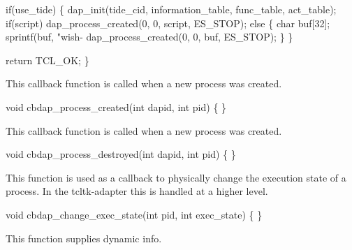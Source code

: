  if(use_tide) \{
    dap_init(tide_cid, information_table, func_table, act_table);
    if(script)
      dap_process_created(0, 0, script, ES_STOP);
    else \{
      char buf[32];
      sprintf(buf, "wish-%
      dap_process_created(0, 0, buf, ES_STOP);
    \}
  \}

  return TCL_OK;
\}
\nwendcode{}\nwdocspar



This callback function is called when a new process was created.

\nwenddocs{}\endmoddef\let\nwnotused=\nwoutput{}
void cbdap_process_created(int dapid, int pid)
\{
\}
\nwendcode{}\nwdocspar


This callback function is called when a new process was created.

\nwenddocs{}\endmoddef\let\nwnotused=\nwoutput{}
void cbdap_process_destroyed(int dapid, int pid)
\{
\}
\nwendcode{}\nwdocspar


This function is used as a callback to physically change
the execution state of a process.
In the tcltk-adapter this is handled at a higher level.

\nwenddocs{}\endmoddef\let\nwnotused=\nwoutput{}
void cbdap_change_exec_state(int pid, int exec_state)
\{
\}
\nwendcode{}\nwdocspar


This function supplies dynamic info.

